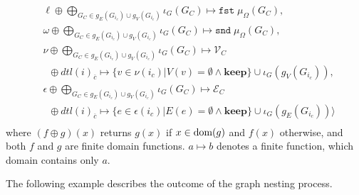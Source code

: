 \begin{definition}
\begin{align*}
	& \ell\oplus\bigoplus_{G_C\in g_E(G_{i_c})\cup g_V(G_{i_c})}\iota_G(G_C)\mapsto\texttt{fst}\;\mu_\Omega(G_C),\\
	& \omega\oplus\bigoplus_{G_C\in g_E(G_{i_c})\cup g_V(G_{i_c})}\iota_G(G_C)\mapsto\texttt{snd}\;\mu_\Omega(G_C),\\
	& \nu\oplus \bigoplus_{G_C\in g_E(G_{i_c})\cup g_V(G_{i_c})}\iota_G(G_C)\mapsto \mathcal{V}_C\\
	& \;\; \oplus dtl(i)_{\overline{c}}\mapsto \{v\in \nu(i_c) | V(v)=\emptyset\wedge\textbf{keep} \}\cup \iota_G(g_V(G_{i_c})),\\
	& \epsilon\oplus \bigoplus_{G_C\in g_E(G_{i_c})\cup g_V(G_{i_c})}\iota_G(G_C)\mapsto \mathcal{E}_C\\
	& \;\; \oplus dtl(i)_{\overline{c}}\mapsto\{e\in \epsilon(i_c) | E(e)=\emptyset\wedge\textbf{keep} \}\cup \iota_G(g_E(G_{i_c}))\Big\rangle\\
	\end{align*}
	where $(f\oplus g)(x)$ returns $g(x)$ if $x\in\textup{dom}(g)$ and $f(x)$ otherwise, and both $f$ and $g$ are finite domain functions. $a\mapsto b$ denotes a finite function, which domain contains only $a$.
\end{definition}

The following example describes the outcome of the graph nesting process.

